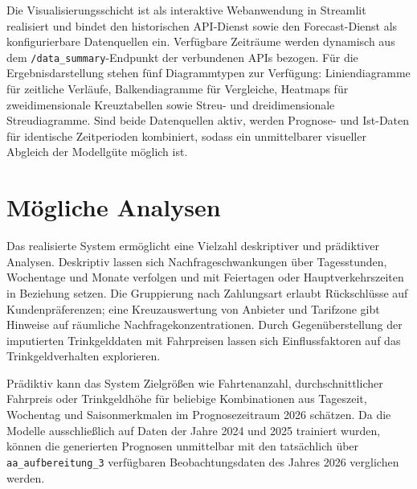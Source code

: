 Die Visualisierungsschicht ist als interaktive Webanwendung in Streamlit \parencite[vgl.]{StreamlitInc.2024} realisiert und bindet den historischen API-Dienst sowie den Forecast-Dienst als konfigurierbare Datenquellen ein. Verfügbare Zeiträume werden dynamisch aus dem \texttt{/data\_summary}-Endpunkt der verbundenen APIs bezogen. Für die Ergebnisdarstellung stehen fünf Diagrammtypen zur Verfügung: Liniendiagramme für zeitliche Verläufe, Balkendiagramme für Vergleiche, Heatmaps für zweidimensionale Kreuztabellen sowie Streu- und dreidimensionale Streudiagramme. Sind beide Datenquellen aktiv, werden Prognose- und Ist-Daten für identische Zeitperioden kombiniert, sodass ein unmittelbarer visueller Abgleich der Modellgüte möglich ist.

\section{Mögliche Analysen}

Das realisierte System ermöglicht eine Vielzahl deskriptiver und prädiktiver Analysen. Deskriptiv lassen sich Nachfrageschwankungen über Tagesstunden, Wochentage und Monate verfolgen und mit Feiertagen oder Hauptverkehrszeiten in Beziehung setzen. Die Gruppierung nach Zahlungsart erlaubt Rückschlüsse auf Kundenpräferenzen; eine Kreuzauswertung von Anbieter und Tarifzone gibt Hinweise auf räumliche Nachfragekonzentrationen. Durch Gegenüberstellung der imputierten Trinkgelddaten mit Fahrpreisen lassen sich Einflussfaktoren auf das Trinkgeldverhalten explorieren.

Prädiktiv kann das System Zielgrößen wie Fahrtenanzahl, durchschnittlicher Fahrpreis oder Trinkgeldhöhe für beliebige Kombinationen aus Tageszeit, Wochentag und Saisonmerkmalen im Prognosezeitraum 2026 schätzen. Da die Modelle ausschließlich auf Daten der Jahre 2024 und 2025 trainiert wurden, können die generierten Prognosen unmittelbar mit den tatsächlich über \texttt{aa\_aufbereitung\_3} verfügbaren Beobachtungsdaten des Jahres 2026 verglichen werden.
